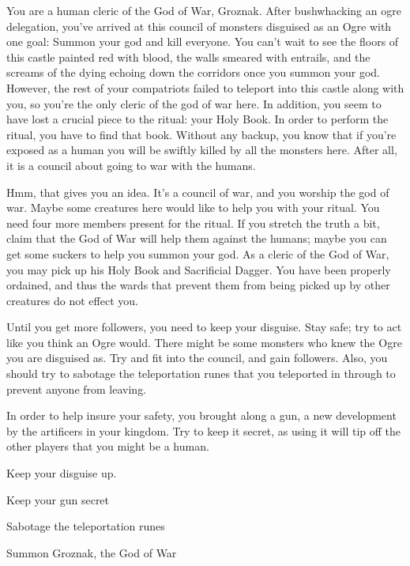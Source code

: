 \documentclass[char]{guildcamp2}
\begin{document}
\name{\cCleric{}}


	You are a human cleric of the God of War, Groznak. After bushwhacking an ogre delegation, you've arrived at this council of monsters disguised as an Ogre with one goal: Summon your god and kill everyone. You can't wait to see the floors of this castle painted red with blood, the walls smeared with entrails, and the screams of the dying echoing down the corridors once you summon your god. However, the rest of your compatriots failed to teleport into this castle along with you, so you're the only cleric of the god of war here. In addition, you seem to have lost a crucial piece to the ritual: your Holy Book. In order to perform the ritual, you have to find that book. Without any backup, you know that if you're exposed as a human you will be swiftly killed by all the monsters here. After all, it is a council about going to war with the humans.
		
	Hmm, that gives you an idea. It's a council of war, and you worship the god of war. Maybe some creatures here would like to help you with your ritual. You need four more members present for the ritual. If you stretch the truth a bit, claim that the God of War will help them against the humans; maybe you can get some suckers to help you summon your god. As a cleric of the God of War, you may pick up his Holy Book and Sacrificial Dagger. You have been properly ordained, and thus the wards that prevent them from being picked up by other creatures do not effect you.
	
	Until you get more followers, you need to keep your disguise. Stay safe; try to act like you think an Ogre would. There might be some monsters who knew the Ogre you are disguised as. Try and fit into the council, and gain followers. Also, you should try to sabotage the teleportation runes that you teleported in through to prevent anyone from leaving.
	
	In order to help insure your safety, you brought along a gun, a new development by the artificers in your kingdom.  Try to keep it secret, as using it will tip off the other players that you might be a human.

\begin{itemz}[Goals]
  \item Keep your disguise up.
  \item Keep your gun secret
  \item Sabotage the teleportation runes
	\item Summon Groznak, the God of War
\end{itemz}
\end{document}
